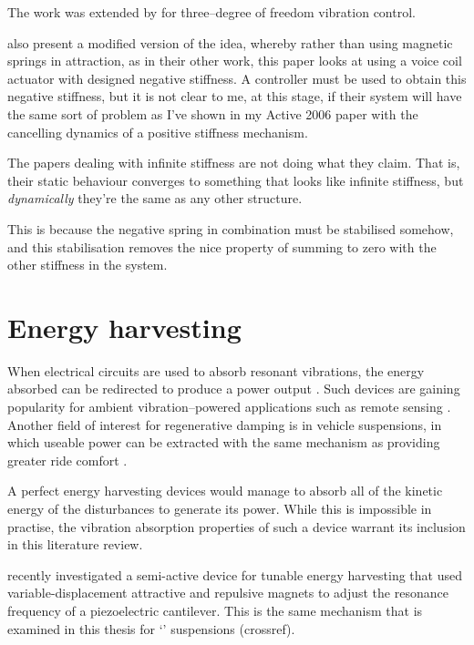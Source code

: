 The work was extended by \textcite{hoque2006} for three--degree of freedom
vibration control.

\textcite{mizuno2003c} also present a modified version of the idea, whereby
rather than using magnetic springs in attraction, as in their other work, this
paper looks at using a voice coil actuator with designed negative stiffness. A
controller must be used to obtain this negative stiffness, but it is not clear
to me, at this stage, if their system will have the same sort of problem as
I've shown in my Active 2006 paper with the cancelling dynamics of a positive
stiffness mechanism.

The papers dealing with infinite stiffness are not doing what they
claim. That is, their static behaviour converges to something that
looks like infinite stiffness, but \emph{dynamically} they're the same
as any other structure.

This is because the negative spring in combination must be
stabilised somehow, and this stabilisation removes the nice property
of summing to zero with the other stiffness in the system.




\section{Energy harvesting}

When electrical circuits are used to absorb resonant vibrations, the energy
absorbed can be redirected to produce a power output \cite{stephen2006}. Such
devices are gaining popularity for ambient vibration--powered applications
such as remote sensing \cite{arnold2007}. Another field of interest for
regenerative damping is in vehicle suspensions, in which useable power can be
extracted with the same mechanism as providing greater ride comfort
\cite{graves2000thesis}.

A perfect energy harvesting devices would manage to absorb all of the kinetic
energy of the disturbances to generate its power. While this is impossible in
practise, the vibration absorption properties of such a device warrant its
inclusion in this literature review.

\textcite{challa2008} recently investigated a
semi-active device for tunable energy harvesting that used
variable-displacement attractive and repulsive magnets to adjust the
resonance frequency of a piezoelectric cantilever. This is the same
mechanism that is examined in this thesis for `\qzs' suspensions
(crossref).

